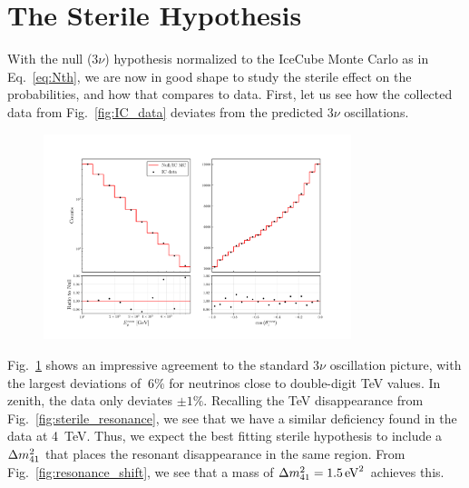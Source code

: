 % 

% 
\section{The Sterile Hypothesis}\label{sec:sterileResults}
With the null ($3\nu$) hypothesis normalized to the IceCube Monte Carlo as in Eq.~\ref{eq:Nth}, we are now in good shape to study the sterile effect on the probabilities, and how that compares to data.
First, let us see how the collected data from Fig.~\ref{fig:IC_data} deviates from the predicted $3\nu$ oscillations.
\begin{figure}
    \centering
    \includegraphics[width=0.8\textwidth]{figures/IC_rates.pdf}
    \caption{}\label{fig:IC_rates}
\end{figure}
Fig.~\ref{fig:IC_rates} shows an impressive agreement to the standard $3\nu$ oscillation picture, with the largest deviations of $~6\%$
for neutrinos close to double-digit \si{\TeV} values. In zenith, the data only deviates $\pm 1\%$. Recalling the \si{\TeV} disappearance from 
Fig.~\ref{fig:sterile_resonance}, we see that we have a similar deficiency found in the data at \SI{4}{\TeV}. Thus, we expect the best fitting 
sterile hypothesis to include a $\dm[41]$ that places the resonant disappearance in the same region. From Fig.~\ref{fig:resonance_shift}, we see
that a mass of $\dm[41] = \SI{1.5}{\eV \squared}$ achieves this. 

